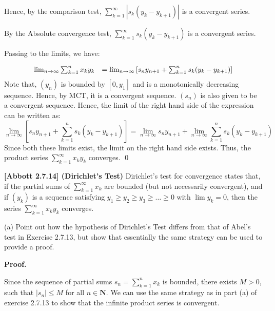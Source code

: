 \documentclass[10pt]{article}
\begin{document}
Hence, by the comparison test, $\displaystyle \sum _{k=1}^{\infty } |s_{k}( y_{k} -y_{k+1}) |$ is a convergent series.



By the Absolute convergence test, $\displaystyle \sum _{k=1}^{\infty } s_{k}( y_{k} -y_{k+1})$ is a convergent series. 

Passing to the limits, we have:


\begin{equation*}
\begin{array}{ c c }
\lim _{n\rightarrow \infty }\sum _{k=1}^{n} x_{k} y_{k} & =\lim _{n\rightarrow \infty }\left[ s_{n} y_{n+1} +\sum _{k=1}^{n} s_{k}( y_{k} -y_{k+1})\right]
\end{array}
\end{equation*}
Note that, $\displaystyle ( y_{n})$ is bounded by $\displaystyle [ 0,y_{1}]$ and is a monotonically decreasing sequence. Hence, by MCT, it is a convergent sequence. $\displaystyle ( s_{n})$ is also given to be a convergent sequence. Hence, the limit of the right hand side of the expression can be written as:
\begin{equation*}
\lim _{n\rightarrow \infty }\left[ s_{n} y_{n+1} +\sum _{k=1}^{n} s_{k}( y_{k} -y_{k+1})\right] =\lim _{n\rightarrow \infty } s_{n} y_{n+1} +\lim _{n\rightarrow \infty }\sum _{k=1}^{n} s_{k}( y_{k} -y_{k+1})
\end{equation*}
Since both these limits exist, the limit on the right hand side exists. Thus, the product series $\displaystyle \sum _{k=1}^{\infty } x_{k} y_{k}$ converges. \qed 



\textbf{[Abbott 2.7.14] (Dirichlet's Test) }Dirichlet's test for convergence states that, if the partial sums of $\displaystyle \sum _{k=1}^{\infty } x_{k}$ are bounded (but not necessarily convergent), and if $\displaystyle ( y_{k})$ is a sequence satisfying $\displaystyle y_{1} \geq y_{2} \geq y_{3} \geq \dotsc \geq 0$ with $\displaystyle \lim y_{k} =0$, then the series $\displaystyle \sum _{k=1}^{\infty } x_{k} y_{k}$ converges.



(a) Point out how the hypothesis of Dirichlet's Test differs from that of Abel's test in Exercise 2.7.13, but show that essentially the same strategy can be used to provide a proof.



\textbf{Proof.}



Since the sequence of partial sums $\displaystyle s_{n} =\sum _{k=1}^{n} x_{k}$ is bounded, there exists $\displaystyle M >0$, such that $\displaystyle |s_{n} |\leq M$ for all $\displaystyle n\in \mathbf{N}$. We can use the same strategy as in part (a) of exercise 2.7.13 to show that the infinite product series is convergent.
\end{document}
